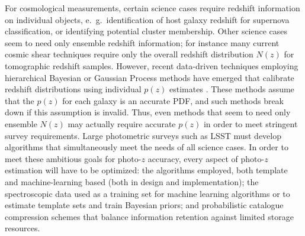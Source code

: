 For cosmological measurements, certain science cases require redshift information on individual objects, e.~g.~identification of host galaxy redshift for supernova classification, or identifying potential cluster membership.
Other science cases seem to need only ensemble redshift information; for instance many current cosmic shear techniques require only the overall redshift distribution $N(z)$ for tomographic redshift samples.  However, recent data-driven techniques employing hierarchical Bayesian or Gaussian Process methods have emerged that calibrate redshift distributions using individual $p(z)$ estimates \citep[e.~g.~][]{Sanchez:2018}.  These methods assume that the $p(z)$ for each galaxy is an accurate PDF, and such methods break down if this assumption is invalid.  Thus, even methods that seem to need only ensemble $N(z)$ may actually require accurate $p(z)$ in order to meet stringent survey requirements.
Large photometric surveys such as LSST must develop algorithms that simultaneously meet the needs of all science cases.
In order to meet these ambitious goals for photo-$z$ accuracy, every aspect of photo-$z$ estimation will have to be optimized: the algorithms employed, both template and machine-learning based (both in design and implementation); the spectroscopic data used as a training set for machine learning algorithms or to estimate template sets and train Bayesian priors; and probabilistic catalogue compression schemes that balance information retention against limited storage resources.

